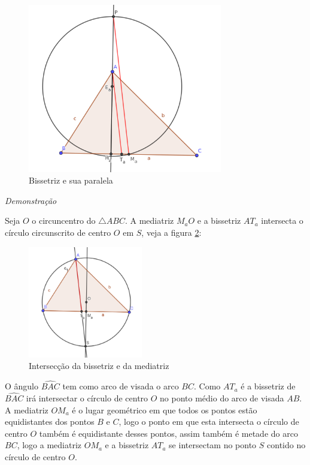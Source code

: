 \documentclass[12pt, openright, a4paper, brazil, openany, oneside]{abntex2}
\begin{document}
\begin{figure}[h]
	
	\center
	
	\includegraphics[width=8.5cm]{trianguloteo.png}
	\caption{Bissetriz e sua paralela \label{triateo}}
	
\end{figure}

\textit{Demonstração}

Seja $O$ o circuncentro do $\triangle ABC$. A mediatriz $M_{a}O$ e a bissetriz $AT_a$ intersecta o círculo circunscrito de centro $O$ em $S$, veja a figura \ref{trianbismed}:

\begin{figure}[h]
	
	\center
	
	\includegraphics[width=5cm]{triangulocirc.png}
	\caption{Intersecção da bissetriz e da mediatriz\label{trianbismed}}
	
\end{figure}

O ângulo $\hat{BAC}$ tem como arco de visada o arco $BC$. Como $AT_a$ é a bissetriz de $\hat{BAC}$ irá intersectar o círculo de centro $O$ no ponto médio do arco de visada $AB$. A mediatriz $OM_a$ é o lugar geométrico em que todos os pontos estão equidistantes dos pontos $B$ e $C$, logo o ponto em que esta intersecta o círculo de centro $O$ também é equidistante desses pontos, assim também é metade do arco $BC$, logo a mediatriz $OM_a$ e a bissetriz $AT_a$ se intersectam no ponto $S$ contido no círculo de centro $O$.
\end{document}

